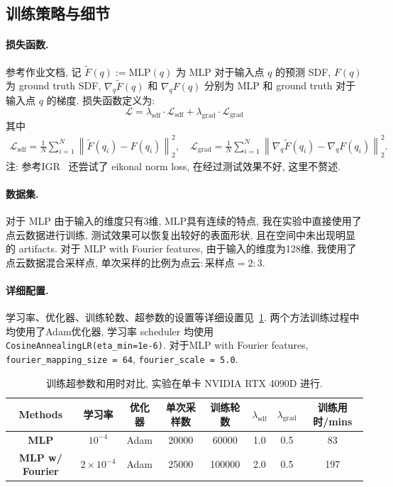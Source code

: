 \documentclass[11pt]{article}
\newcommand\1{\mathds{1}}
\begin{document}
\subsection{训练策略与细节}
\paragraph{损失函数.} 参考作业文档, 记 $\tilde{F}(q) := \text{MLP}(q)$ 为 MLP 对于输入点 $q$ 的预测 SDF, $F(q)$ 为 ground truth SDF, $\nabla_q \tilde{F}(q)$ 和 $\nabla_q F(q)$ 分别为 MLP 和 ground truth 对于输入点 $q$ 的梯度. 损失函数定义为:
\begin{equation}
    \mathcal{L} = \lambda_{\text{sdf}} \cdot \mathcal{L}_{\text{sdf}} + \lambda_{\text{grad}} \cdot \mathcal{L}_{\text{grad}}
\end{equation}
其中
\begin{gather}
    \mathcal{L}_{\text{sdf}} = \frac{1}{N} \sum_{i=1}^{N} \left\| \tilde{F}(q_i) - F(q_i) \right\|^2_2, \quad\mathcal{L}_{\text{grad}} = \frac{1}{N} \sum_{i=1}^{N} \left\| \nabla_q \tilde{F}(q_i) - \nabla_q F(q_i) \right\|^2_2.
\end{gather}
注: 参考IGR~\cite{gropp2020implicitgeometricregularizationlearning} 还尝试了 eikonal norm loss, 在经过测试效果不好, 这里不赘述.

\paragraph{数据集.} 对于 MLP 由于输入的维度只有3维, MLP具有连续的特点, 我在实验中直接使用了点云数据进行训练, 测试效果可以恢复出较好的表面形状, 且在空间中未出现明显的 artifacts.
对于 MLP with Fourier features, 由于输入的维度为128维, 我使用了点云数据混合采样点, 单次采样的比例为$\text{点云}:\text{采样点} = 2:3$. 

\paragraph{详细配置.} 学习率、优化器、训练轮数、超参数的设置等详细设置见~\cref{tab:params}. 两个方法训练过程中均使用了Adam优化器, 学习率 scheduler 均使用 \texttt{CosineAnnealingLR(eta\_min=1e-6)}.
对于MLP with Fourier features, \texttt{fourier\_mapping\_size = 64}, \texttt{fourier\_scale = 5.0}.
\begin{table}[htbp]
    \centering
    \begin{tabular}{cccccccc}
        \toprule
        \textbf{Methods} & \textbf{学习率} & \textbf{优化器} & \textbf{单次采样数} & \textbf{训练轮数} & $\lambda_{\text{sdf}}$ & $\lambda_{\text{grad}}$ & \textbf{训练用时/mins} \\
        \midrule
        \textbf{MLP} & $10^{-4}$ & Adam & 20000 & 60000& 1.0 & 0.5 & 83 \\
        \textbf{MLP w/ Fourier} &  $2 \times 10^{-4}$ & Adam & 25000 & 100000& 2.0 & 0.5 & 197\\
        \bottomrule
    \end{tabular}
    \caption{训练超参数和用时对比, 实验在单卡 NVIDIA RTX 4090D 进行.}
    \label{tab:params}
\end{table}
\end{document}
